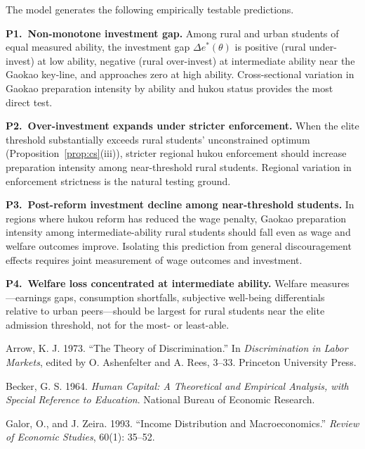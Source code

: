 \documentclass[12pt]{article}
\theoremstyle{plain}
\theoremstyle{definition}
\theoremstyle{remark}
\begin{document}
The model generates the following empirically testable predictions.

\textbf{P1.~Non-monotone investment gap.}  Among rural and urban students of
equal measured ability, the investment gap $\Delta e^{*}(\theta)$ is positive
(rural under-invest) at low ability, negative (rural over-invest) at intermediate
ability near the Gaokao key-line, and approaches zero at high ability.
Cross-sectional variation in Gaokao preparation intensity by ability and hukou
status provides the most direct test.

\textbf{P2.~Over-investment expands under stricter enforcement.}  When the elite
threshold substantially exceeds rural students' unconstrained optimum
(Proposition~\ref{prop:cs}(iii)), stricter regional hukou enforcement should
increase preparation intensity among near-threshold rural students.  Regional
variation in enforcement strictness is the natural testing ground.

\textbf{P3.~Post-reform investment decline among near-threshold students.}  In
regions where hukou reform has reduced the wage penalty, Gaokao preparation
intensity among intermediate-ability rural students should fall even as wage and
welfare outcomes improve.  Isolating this prediction from general discouragement
effects requires joint measurement of wage outcomes and investment.

\textbf{P4.~Welfare loss concentrated at intermediate ability.}  Welfare measures
---earnings gaps, consumption shortfalls, subjective well-being differentials
relative to urban peers---should be largest for rural students near the elite
admission threshold, not for the most- or least-able.

\begin{thebibliography}{}

Arrow, K. J. 1973. ``The Theory of Discrimination.''
In \textit{Discrimination in Labor Markets},
edited by O. Ashenfelter and A. Rees, 3--33.
Princeton University Press.

Becker, G. S. 1964.
\textit{Human Capital: A Theoretical and Empirical Analysis,
with Special Reference to Education}.
National Bureau of Economic Research.

Galor, O., and J. Zeira. 1993.
``Income Distribution and Macroeconomics.''
\textit{Review of Economic Studies}, 60(1): 35--52.

\end{thebibliography}
\end{document}

